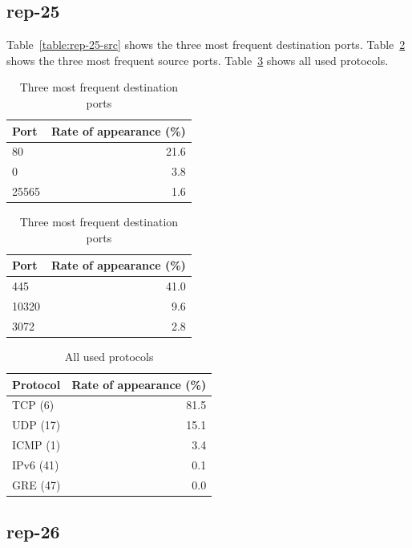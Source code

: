 \documentclass{article}
\begin{document}
\subsection{rep-25}

Table~\ref{table:rep-25-src} shows the three most frequent destination ports.
Table~\ref{table:rep-25-dst} shows the three most frequent source ports.
Table~\ref{table:rep-25-proto} shows all used protocols.

\begin{table}[H]
    \parbox{.45\linewidth}{
        \centering
        \begin{tabular}{l|r}
            Port & Rate of appearance (\%) \\
            \hline
            80 & 21.6 \\
            0 & 3.8 \\
            25565 & 1.6 \\
        \end{tabular}
        \caption{\label{table:rep-25-src} Three most frequent source ports}
    }
    \parbox{.45\linewidth}{
        \centering
        \begin{tabular}{l|r}
            Port & Rate of appearance (\%) \\
            \hline
            445 & 41.0 \\
            10320 & 9.6 \\
            3072 & 2.8 \\
        \end{tabular}
        \caption{\label{table:rep-25-dst} Three most frequent destination ports}
    }
\end{table}

\begin{table}[h]
    \centering
    \begin{tabular}{l|r}
        Protocol & Rate of appearance (\%) \\
        \hline
        TCP (6) & 81.5 \\
        UDP (17) & 15.1 \\
        ICMP (1) & 3.4 \\
        IPv6 (41) & 0.1 \\
        GRE (47) & 0.0 \\
    \end{tabular}
    \caption{\label{table:rep-25-proto} All used protocols}
\end{table}

\subsection{rep-26}
\end{document}
